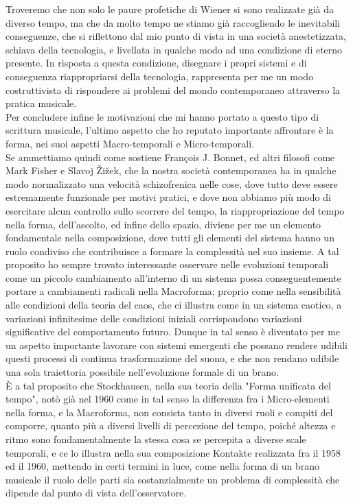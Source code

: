 Troveremo che non solo le paure profetiche di Wiener si sono realizzate già da diverso tempo, 
ma che da molto tempo ne stiamo già raccogliendo le inevitabili conseguenze,
che si riflettono dal mio punto di vista in una società anestetizzata, 
schiava della tecnologia, e livellata in qualche modo ad una condizione di eterno presente.
In risposta a questa condizione, disegnare i propri sistemi e di conseguenza riappropriarsi della tecnologia,
rappresenta per me un modo costruttivista di rispondere ai problemi del mondo contemporaneo
attraverso la pratica musicale.\\
Per concludere infine le motivazioni che mi hanno portato a questo tipo di scrittura musicale, 
l'ultimo aspetto che ho reputato importante affrontare è la forma,
nei suoi aspetti Macro-temporali e Micro-temporali. \\
Se ammettiamo quindi come sostiene François J. Bonnet, ed altri filosofi come Mark Fisher e Slavoj Žižek,
che la nostra società contemporanea ha in qualche modo normalizzato
una velocità schizofrenica nelle cose, dove tutto deve essere estremamente funzionale per motivi pratici,
e dove non abbiamo più modo di esercitare alcun controllo sullo scorrere del tempo,
la riappropriazione del tempo nella forma, dell'ascolto, ed infine dello spazio, diviene per me un elemento fondamentale
nella composizione,
dove tutti gli elementi del sistema hanno un ruolo condiviso che contribuisce 
a formare la complessità nel suo insieme.
A tal proposito ho sempre trovato interessante osservare nelle evoluzioni temporali 
come un piccolo cambiamento all'interno di un sistema possa conseguentemente portare 
a cambiamenti radicali
nella Macroforma; proprio come nella sensibilità alle condizioni della teoria del caos, 
che ci illustra come in un sistema caotico, a variazioni infinitesime delle condizioni iniziali 
corrispondono variazioni significative del comportamento futuro. 
Dunque in tal senso è diventato per me un aspetto importante lavorare con
sistemi emergenti che possano rendere udibili questi processi di continua trasformazione
del suono, e che non rendano udibile una sola traiettoria possibile nell'evoluzione formale
di un brano.\\
È a tal proposito che Stockhausen, nella sua teoria della "Forma unificata del tempo", 
notò già nel 1960 come in tal senso la differenza fra i Micro-elementi nella forma, 
e la Macroforma, non consista tanto in diversi ruoli e compiti del comporre,
quanto più a diversi livelli di percezione del tempo, 
poiché altezza e ritmo sono fondamentalmente la stessa cosa se percepita a diverse scale temporali,
e ce lo illustra nella sua composizione Kontakte realizzata fra il 1958 ed il 1960, 
mettendo in certi termini in luce,
come nella forma di un brano musicale il ruolo delle parti sia sostanzialmente un problema 
di complessità
che dipende dal punto di vista dell'osservatore.

